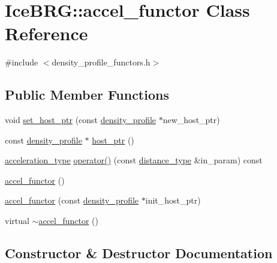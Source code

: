 \hypertarget{classIceBRG_1_1accel__functor}{}\section{Ice\+B\+R\+G\+:\+:accel\+\_\+functor Class Reference}
\label{classIceBRG_1_1accel__functor}


{\ttfamily \#include $<$density\+\_\+profile\+\_\+functors.\+h$>$}

\subsection*{Public Member Functions}
\begin{DoxyCompactItemize}
\item 
void \hyperlink{classIceBRG_1_1accel__functor_aa932fee0fb4feb33a1e8ec7ce830ef18}{set\+\_\+host\+\_\+ptr} (const \hyperlink{classIceBRG_1_1density__profile}{density\+\_\+profile} $\ast$new\+\_\+host\+\_\+ptr)
\item 
const \hyperlink{classIceBRG_1_1density__profile}{density\+\_\+profile} $\ast$ \hyperlink{classIceBRG_1_1accel__functor_a6c39598344f5e26c7c804a16e9bb1f71}{host\+\_\+ptr} ()
\item 
\hyperlink{namespaceIceBRG_ab10fe6d8fe6432a7dc0aa5a8ecac6a14}{acceleration\+\_\+type} \hyperlink{classIceBRG_1_1accel__functor_aa277cd8ec6adc04041b4f2b58720ea59}{operator()} (const \hyperlink{namespaceIceBRG_a45499647eb87e24c10ab32c628711cec}{distance\+\_\+type} \&in\+\_\+param) const 
\item 
\hyperlink{classIceBRG_1_1accel__functor_ae3a62fffa00404d4b25143e5139b4cdc}{accel\+\_\+functor} ()
\item 
\hyperlink{classIceBRG_1_1accel__functor_a73d7e481cf3d4373ac6bb1f04da90bbe}{accel\+\_\+functor} (const \hyperlink{classIceBRG_1_1density__profile}{density\+\_\+profile} $\ast$init\+\_\+host\+\_\+ptr)
\item 
virtual \hyperlink{classIceBRG_1_1accel__functor_ab9681db13d78a1b6187b85a0f47095e5}{$\sim$accel\+\_\+functor} ()
\end{DoxyCompactItemize}


\subsection{Constructor \& Destructor Documentation}
\hypertarget{classIceBRG_1_1accel__functor_ae3a62fffa00404d4b25143e5139b4cdc}{}
